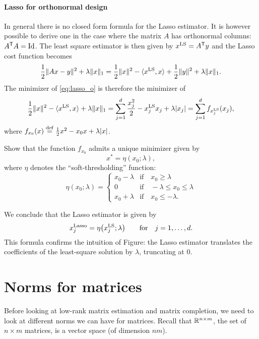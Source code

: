 \documentclass[11pt,nocut]{article}
\begin{document}
\paragraph{Lasso for orthonormal design}
In general there is no closed form formula for the Lasso estimator. It is however possible to derive one in the case where the matrix $A$ has orthonormal columns: $A^{{\sf T}} A = {{\rm Id}}$. 
The least square estimator is then given by $x^{\rm LS} = A^{{\sf T}} y$ and the Lasso cost function becomes
\begin{equation}\label{eq:lasso_o}
\frac{1}{2} \| Ax - y \|^2 + \lambda \|x\|_1 
= \frac{1}{2} \|x\|^2 - \langle x^{\rm LS}, x \rangle + \frac{1}{2} \|y\|^2 + \lambda \|x\|_1.
\end{equation}
The minimizer of \eqref{eq:lasso_o} is therefore the minimizer of
$$
\frac{1}{2} \|x\|^2 - \langle x^{\rm LS}, x \rangle + \lambda \|x\|_1
=
\sum_{j=1}^d \frac{x_j^2}{2} - x^{\rm LS}_j x_j + \lambda |x_j| 
=
\sum_{j=1}^d f_{x_j^{\rm LS}}(x_j),
$$
where $f_{x_0}(x) \overset{\rm def}{=} \frac{1}{2}x^2 - x_0 x + \lambda |x|$.

\begin{exercise}
	Show that the function $f_{x_0}$ admits a unique minimizer given by
	$$
	x^* = \eta(x_0; \lambda),
	$$
	where $\eta$ denotes the ``soft-thresholding'' function:
	$$
	\eta(x_0;\lambda) = 
	\begin{cases}
		x_0-\lambda & \text{if} \quad x_0 \geq \lambda \\
		0 & \text{if} \quad -\lambda \leq x_0 \leq \lambda \\
		x_0 + \lambda & \text{if} \quad x_0 \leq -\lambda.
	\end{cases}
	$$
\end{exercise}
\vspace{2mm}

We conclude that the Lasso estimator is given by
$$
x^{\rm Lasso}_{j} = \eta\big(x_j^{\rm LS}; \lambda\big) \qquad \text{for} \quad j=1, \dots, d.
$$
This formula confirms the intuition of Figure: the Lasso estimator translates the coefficients of the least-square solution by $\lambda$, truncating at $0$.

\section{Norms for matrices}

Before looking at low-rank matrix estimation and matrix completion, we need to look at different norms we can have for matrices. Recall that $\mathbb{R}^{n \times m}$, the set of $n \times m$ matrices, is a vector space (of dimension $nm$).
\\
\end{document}
